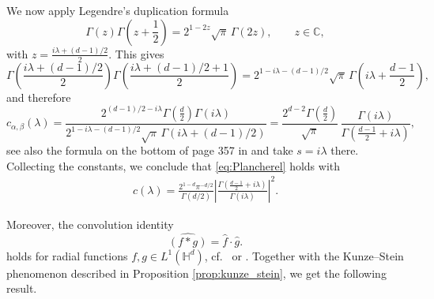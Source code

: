 \documentclass[11pt,a4paper]{article}
\theoremstyle{plain}
\theoremstyle{definition}
\theoremstyle{remark}
\def\CC{\mathbb{C}}
\def\HH{\mathbb{H}}
\begin{document}
We now apply Legendre's duplication formula
\begin{equation}\label{eq:Legendre}
\Gamma(z)\Gamma\!\left(z+\frac12\right)
=
2^{1-2z}\sqrt{\pi}\,\Gamma(2z),
\qquad z\in\CC,
\end{equation}
with $z=\frac{i\lambda+(d-1)/2}{2}$.
This gives
\[
\Gamma\!\left(\frac{i\lambda+(d-1)/2}{2}\right)
\Gamma\!\left(\frac{i\lambda+(d-1)/2+1}{2}\right)
=
2^{1-i\lambda-(d-1)/2}\sqrt{\pi}\,
\Gamma\!\left(i\lambda+\frac{d-1}{2}\right),
\]
and therefore
\[
c_{\alpha,\beta}(\lambda)
=
\frac{2^{(d-1)/2-i\lambda}\Gamma(\frac{d}{2})\Gamma(i\lambda)}
{2^{1-i\lambda-(d-1)/2}\sqrt{\pi}\,\Gamma(i\lambda+(d-1)/2)}
=
\frac{2^{d-2}\Gamma(\frac{d}{2})}{\sqrt{\pi}}\,
\frac{\Gamma(i\lambda)}{\Gamma\!\left(\frac{d-1}{2}+i\lambda\right)},
\]
see also the formula on the bottom of page 357 in \cite{Faraut} and take $s=i\lambda$ there. Collecting the constants, we conclude that \eqref{eq:Plancherel} holds with
\begin{align}\label{eq:Cfunction}
c(\lambda)
=
\frac{2^{1-d}\pi^{-d/2}}{\Gamma(d/2)}
\left|
\frac{\Gamma\!\left(\frac{d-1}{2}+i\lambda\right)}{\Gamma(i\lambda)}
\right|^2.
\end{align}




Moreover, the convolution identity
\begin{equation}\label{eq:convolution_identity}
    \widehat{(f*g)} = \widehat{f} \cdot \widehat{g}.   
\end{equation}
holds for radial functions $f,g \in L^1(\HH^d)$, cf.\ \cite[page 411]{Faraut} or \cite[page 43]{Helgason}.
Together with the Kunze--Stein phenomenon described in Proposition \ref{prop:kunze_stein}, we get the following result.
\end{document}
